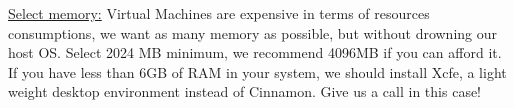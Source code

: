 \documentclass[a4paper]{article}
\begin{document}
\noindent
\hyperref[fig:VB_memory]{Select memory:} Virtual Machines are expensive in terms of resources consumptions, we want as many memory as possible, but without drowning our host OS. Select 2024 MB minimum, we recommend 4096MB if you can afford it. If you have less than 6GB of RAM in your system, we should install Xcfe, a light weight desktop environment instead of Cinnamon. Give us a call in this case!\\


\begin{figure}[H]
    \begin{minipage}{0.5\linewidth}
    \end{minipage}
    \begin{minipage}{0.5\linewidth}
\end{minipage}
\end{figure}
\end{document}
